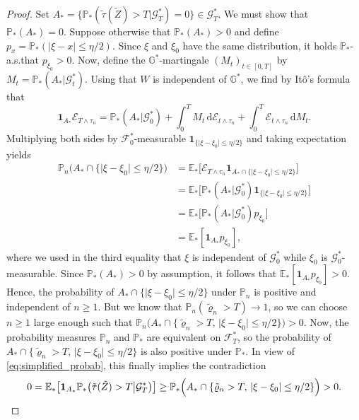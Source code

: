 \documentclass[11pt, a4paper]{article}
\theoremstyle{plain}
\theoremstyle{definition}
\theoremstyle{remark}
\numberwithin{equation}{section}
\newcommand{\ev}{\mathbb{E}}
\newcommand{\pr}{\mathbb{P}}
\newcommand{\F}{\mathcal{F}}
\renewcommand{\d}{\mathrm{d}}
\newcommand{\bb}[1]{\mathbb{#1}}
\renewcommand{\bf}[1]{\mathbf{#1}}
\renewcommand{\cal}[1]{\mathcal{#1}}
\begin{document}
\begin{proof}
Set $A_{\ast} = \{\pr_{\ast}(\tilde{\tau}(\tilde{Z}) > T \vert \cal{G}^{\ast}_T) = 0\} \in \cal{G}^{\ast}_T$. We must show that $\pr_{\ast}(A_{\ast}) = 0$. Suppose otherwise that $\pr_{\ast}(A_{\ast}) > 0$ and define $p_x = \pr_{\ast}(\lvert \xi - x\rvert \leq \eta/2)$. Since $\xi$ and $\xi_0$ have the same distribution, it holds $\pr_{\ast}$-a.s.\@ that $p_{\xi_0} > 0$. Now, define the $\bb{G}^{\ast}$-martingale $(M_t)_{t \in [0, T]}$ by $M_t = \pr_{\ast}(A_{\ast} \vert \cal{G}^{\ast}_t)$. Using that $W$ is independent of $\bb{G}^{\ast}$, we find by It\^o's formula that
\begin{equation*}
    \bf{1}_{A_{\ast}} \cal{E}_{T \land \tau_n} = \pr_{\ast}(A_{\ast} \vert \cal{G}^{\ast}_0) + \int_0^T M_t \, \d \cal{E}_{t \land \tau_n} + \int_0^T \cal{E}_{t \land \tau_n} \, \d M_t.
\end{equation*}
Multiplying both sides by $\F^{\ast}_0$-measurable $\bf{1}_{\{\lvert \xi - \xi_0\rvert \leq \eta/2\}}$ and taking expectation yields
\begin{align*}
    \pr_n\bigl(A_{\ast} \cap \{\lvert \xi - \xi_0\rvert \leq \eta/2\}\bigr) &= \ev_{\ast}\bigl[\cal{E}_{T \land \tau_n} \bf{1}_{A_{\ast} \cap \{\lvert \xi - \xi_0\rvert \leq \eta/2\}}\bigr] \\
    &= \ev_{\ast}\bigl[\pr_{\ast}(A_{\ast} \vert \cal{G}^{\ast}_0) \bf{1}_{\{\lvert \xi - \xi_0\rvert \leq \eta/2\}}\bigr] \\
    &= \ev_{\ast}\bigl[\pr_{\ast}(A_{\ast} \vert \cal{G}^{\ast}_0) p_{\xi_0}\bigr] \\
    &= \ev_{\ast}[\bf{1}_{A_{\ast}} p_{\xi_0}],
\end{align*}
where we used in the third equality that $\xi$ is independent of $\cal{G}^{\ast}_0$ while $\xi_0$ is $\cal{G}^{\ast}_0$-measurable. Since $\pr_{\ast}(A_{\ast}) > 0$ by assumption, it follows that $\ev_{\ast}[\bf{1}_{A_{\ast}} p_{\xi_0}] > 0$. Hence, the probability of $A_{\ast} \cap \{\lvert \xi - \xi_0\rvert \leq \eta/2\}$ under $\pr_n$ is positive and independent of $n \geq 1$. But we know that $\pr_n(\tilde{\varrho}_n > T) \to 1$, so we can choose $n \geq 1$ large enough such that $\pr_n\bigl(A_{\ast} \cap \{\tilde{\varrho}_n > T,\, \lvert \xi - \xi_0\rvert \leq \eta/2\}\bigr) > 0$. Now, the probability measures $\pr_n$ and $\pr_{\ast}$ are equivalent on $\F^{\ast}_T$, so the probability of $A_{\ast} \cap \{\tilde{\varrho}_n > T,\, \lvert \xi - \xi_0\rvert \leq \eta/2\}$ is also positive under $\pr_{\ast}$. In view of \eqref{eq:simplified_probab}, this finally implies the contradiction
\begin{align*}
    0 = \ev_{\ast}\bigl[\bf{1}_{A_{\ast} }\pr_{\ast}\bigl(\tilde{\tau}(\tilde{Z}) > T \big\vert \cal{G}^{\ast}_T\bigr)\bigr] \geq \pr_{\ast}\Bigl(A_{\ast} \cap \{\tilde{\varrho}_n > T,\, \lvert \xi - \xi_0\rvert \leq \eta/2\}\Bigr) > 0.
\end{align*}


\end{proof}
\end{document}
